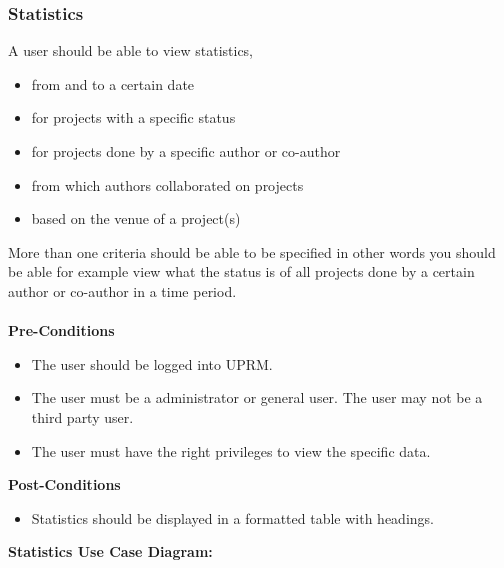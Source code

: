 \subsubsection{Statistics}
A user should be able to view statistics,
\begin{itemize}
	\item from and to a certain date
	\item for projects with a specific status
	\item for projects done by a specific author or co-author
	\item from which authors collaborated on projects
	\item based on the venue of a project(s)\\
\end{itemize}
More than one criteria should be able to be specified in other words you should be able for example view what the status is of all projects done by a certain author or co-author in a time period.\\ \\
\textbf{Pre-Conditions}
\begin{itemize}
	\item The user should be logged into UPRM.
	\item The user must be a administrator or general user. The user may not be a third party user.
	\item The user must have the right privileges to view the specific data.\\
\end{itemize}
\textbf{Post-Conditions}
\begin{itemize}
	\item Statistics should be displayed in a formatted table with headings.\\
\end{itemize}
\textbf{Statistics Use Case Diagram:}\\
\centerline{}